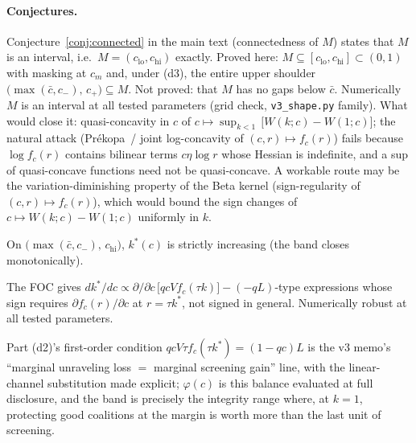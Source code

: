 \paragraph{Conjectures.}
Conjecture~\ref{conj:connected} in the main text (connectedness of $M$) states that $M$
is an interval, i.e.\ $M = (c_{\mathrm{lo}}, c_{\mathrm{hi}})$ exactly. Proved here:
$M \subseteq [c_{\mathrm{lo}}, c_{\mathrm{hi}}] \subset (0,1)$ with masking at $c_m$
and, under (d3), the entire upper shoulder
$\bigl( \max(\bar c, c_-),\, c_+ \bigr) \subseteq M$. Not proved: that $M$ has no gaps
below $\bar c$. Numerically $M$ is an interval at all tested parameters (grid check,
\texttt{v3\_shape.py} family). What would close it: quasi-concavity in $c$ of
$c \mapsto \sup_{k < 1}\, \bigl[ W(k; c) - W(1; c) \bigr]$; the natural attack
(Pr\'ekopa~/ joint log-concavity of $(c, r) \mapsto f_c(r)$) fails because
$\log f_c(r)$ contains bilinear terms $c\eta \log r$ whose Hessian is indefinite, and a
sup of quasi-concave functions need not be quasi-concave. A workable route may be the
variation-diminishing property of the Beta kernel (sign-regularity of
$(c, r) \mapsto f_c(r)$), which would bound the sign changes of
$c \mapsto W(k; c) - W(1; c)$ uniformly in $k$.

\begin{conjecture}\label{conj:monotone}
On $\bigl( \max(\bar c, c_-),\, c_{\mathrm{hi}} \bigr)$, $k^*(c)$ is strictly
increasing (the band closes monotonically).
\end{conjecture}

\noindent The FOC gives
$dk^*/dc \propto \partial/\partial c\,\bigl[ qcV f_c(\tau k) \bigr] - (-qL)$-type
expressions whose sign requires $\partial f_c(r)/\partial c$ at $r = \tau k^*$, not
signed in general. Numerically robust at all tested parameters.

\begin{remark}\label{rem:foc}
Part (d2)'s first-order condition $qcV\tau f_c(\tau k^*) = (1 - qc)L$ is the v3 memo's
``marginal unraveling loss $=$ marginal screening gain'' line, with the linear-channel
substitution made explicit; $\varphi(c)$ is this balance evaluated at full disclosure,
and the band is precisely the integrity range where, at $k = 1$, protecting good
coalitions at the margin is worth more than the last unit of screening.
\end{remark}
